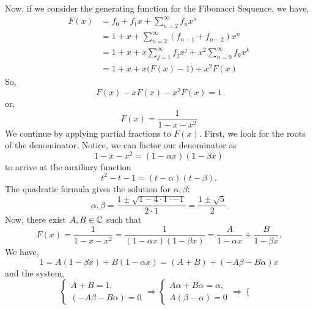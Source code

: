 \documentclass[11pt]{article}
\begin{document}
\begin{titlepage}
Now, if we consider the generating function for the Fibonacci Sequence, we have,
\begin{align*}
    F(x) &= f_0 + f_1x + \sum^\infty_{n=2} f_nx^n\\
         &= 1 + x + \sum^\infty_{n=2} (f_{n-1} + f_{n-2}) x^n\\
         &= 1 + x + x\sum^\infty_{j=1} f_jx^j + x^2\sum^\infty_{n=0} f_kx^k\\
         &= 1 + x + x\big(F(x) - 1\big) + x^2F(x)
\end{align*}
So,
\begin{equation*}
    F(x) - xF(x) - x^2F(x) = 1
\end{equation*}
or,
\begin{equation*}
    F(x) = \frac{1}{1-x-x^2}
\end{equation*}
We continue by applying partial fractions to $F(x)$. First, we look for the
roots of the denominator. Notice, we can factor our denominator as
\begin{equation*}
	1 - x - x^2 = (1 - \alpha x) (1 - \beta x)
\end{equation*}
to arrive at the auxiliary function
\begin{equation*}
	t^2 -  t - 1 = (t - \alpha) (t - \beta).
\end{equation*}
The quadratic formula gives the solution for $\alpha, \beta$:
\begin{equation*}
	\alpha, \beta = \frac{1 \pm \sqrt{1 - 4 \cdot 1 \cdot -1}}{2 \cdot 1}
	= \frac{1 \pm \sqrt{5}}{2}
\end{equation*}
Now, there exist $A,B \in \mathbb{C}$ such that
\begin{equation*}
	F(x) = \frac{1}{1-x-x^2} = \frac{1}{(1-\alpha x)(1-\beta x)} =
	\frac{A}{1-\alpha x} + \frac{B}{1-\beta x}.
\end{equation*}
We have,
\begin{equation*}
	1 = A(1-\beta x) + B(1-\alpha x) = (A+B) + (-A\beta - B\alpha) x
\end{equation*}
and the system,
\begin{equation*}
\begin{cases}
	A + B = 1,\\
	(-A\beta - B\alpha) = 0
\end{cases}
\Rightarrow
\begin{cases}
	A\alpha + B\alpha = \alpha,\\
	A(\beta - \alpha) = 0
\end{cases}
\Rightarrow
\begin{cases}

\end{cases}
\end{equation*}
\end{titlepage}
\end{document}
